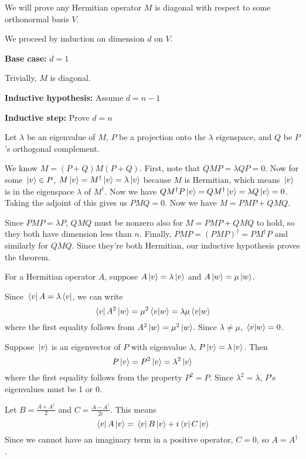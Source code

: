 \exercise
We will prove any Hermitian operator $M$ is diagonal with respect to some orthonormal basis $V$. 

We proceed by induction on dimension $d$ on $V$. 

\textbf{Base case: }$d = 1$

Trivially, $M$ is diagonal. 

\textbf{Inductive hypothesis: } Assume $d = n - 1$

\textbf{Inductive step: } Prove $d = n$

Let $\lambda$ be an eigenvalue of $M$, $P$ be a projection onto the $\lambda$ eigenspace, and $Q$ be $P$'s orthogonal complement. 

We know $M = (P + Q) M (P + Q)$. First, note that $QMP = \lambda QP = 0$. Now for some $\ket*{v} \in P$, $M \ket*{v} = M^{\dagger} \ket*{v} = \lambda \ket*{v}$ because $M$ is Hermitian, which means $\ket*{v}$ is in the eigenspace $\lambda$ of $M^{\dagger}$. Now we have $QM^{\dagger} P \ket*{v} = QM^{\dagger} \ket*{v} = \lambda Q \ket*{v} = 0$. Taking the adjoint of this gives us $PMQ = 0$. Now we have $M = PMP + QMQ$.

Since $PMP = \lambda P$, $QMQ$ must be nonzero also for $M = PMP + QMQ$ to hold, so they both have dimension less than $n$. Finally, $PMP = (PMP)^{\dagger} = PM^{\dagger}P$ and similarly for $QMQ$. Since they're both Hermitian, our inductive hypothesis proves the theorem. 

\exercise
For a Hermitian operator $A$, suppose $A \ket*{v} = \lambda \ket*{v}$ and $A \ket*{w} = \mu \ket*{w}$. 

Since $\bra*{v} A = \lambda \bra*{v}$, we can write 
$$\bra*{v} A^{2} \ket*{w} = \mu^{2} \bra*{v} \ket*{w} = \lambda \mu \bra*{v} \ket*{w}$$
where the first equality follows from $A^{2} \ket*{w} = \mu^{2} \ket*{w}$. Since $\lambda \neq \mu$, $\braket*{v}{w} = 0$. 

\exercise
Suppose $\ket*{v}$ is an eigenvector of $P$ with eigenvalue $\lambda$, $P \ket*{v} = \lambda \ket*{v}$. Then
$$P \ket*{v} = P^{2} \ket*{v} = \lambda^{2} \ket*{v}$$
where the first equality follows from the property $P^{2} = P$. Since $\lambda^{2} = \lambda$, $P$'s eigenvalues must be 1 or 0. 

\exercise
Let $B = \frac{A + A^{\dagger}}{2}$ and $C = \frac{A - A^{\dagger}}{2i}$. This means 
$$\bra*{v} A \ket*{v} = \bra*{v} B \ket*{v} + i \bra*{v} C \ket*{v}$$
Since we cannot have an imaginary term in a positive operator, $C = 0$, so $A = A^{\dagger}$. 

